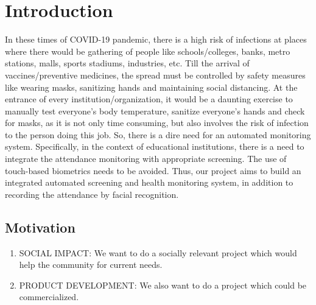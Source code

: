 \chapter{Introduction}
\noindent
In these times of COVID-19 pandemic, there is a high risk of infections at places where there would be gathering of people like schools/colleges, banks, metro stations, malls, sports stadiums, industries, etc. Till the arrival of vaccines/preventive medicines, the spread must be controlled by safety measures like wearing masks, sanitizing hands and maintaining social distancing. At the entrance of every institution/organization, it would be a daunting exercise to manually test everyone’s body temperature, sanitize everyone’s hands and check for masks, as it is not only time consuming, but also involves the risk of infection to the person doing this job. So, there is a dire need for an automated monitoring system. 
Specifically, in the context of educational institutions, there is a need to integrate the attendance monitoring with appropriate screening. The use of touch-based biometrics needs to be avoided.  Thus, our project aims to build an integrated automated screening and health monitoring system, in addition to recording the attendance by facial recognition.

\section{Motivation}
\begin{enumerate}
	\item SOCIAL IMPACT: We want to do a socially relevant project which would help the community for current needs. \par 
	\item PRODUCT DEVELOPMENT:
We also want to do a project which could be commercialized.
 \par
\end{enumerate}

